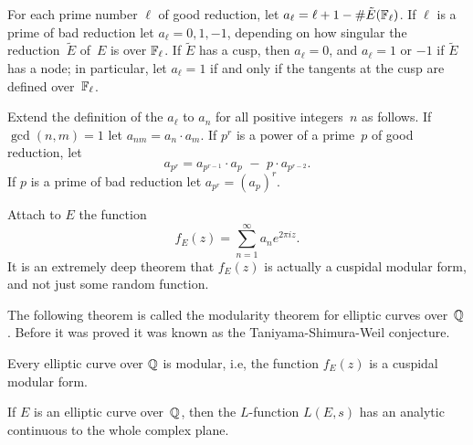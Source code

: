 For each prime number $\ell$ of good reduction, let $a_\ell = \ell+1 -
\#\tilde{E}(\mathbb{F}_{\ell})$.  If $\ell$ is a prime of bad reduction let
$a_\ell = 0,1,-1$, depending on how singular the reduction~$\tilde{E}$
of~$E$ is over $\mathbb{F}_{\ell}$.  If $\tilde{E}$ has a cusp, then $a_\ell=0$,
and $a_\ell=1$ or $-1$ if $\tilde{E}$ has a node; in particular,
let $a_\ell=1$ if
and only if the tangents at the cusp are defined over~$\mathbb{F}_{\ell}$.

Extend the definition of the $a_\ell$ to $a_n$ for all positive
integers~$n$ as follows.  If $\gcd(n,m)=1$ let $a_{nm} = a_n \cdot
a_m$.  If $p^r$ is a power of a prime~$p$ of good reduction, let
$$
 a_{p^r} = a_{p^{r-1}}\cdot a_p \,\,-\,\, p \cdot a_{p^{r-2}}.
$$
If $p$ is a prime of bad reduction let $a_{p^r} = (a_p)^r$.

Attach to $E$ the function
$$
  f_E(z) = \sum_{n=1}^{\infty} a_n e^{2\pi i z}.
$$
It is an extremely deep theorem that $f_E(z)$ is actually
a cuspidal modular form, and not just some random function.


The following theorem is called the modularity theorem for elliptic
curves over~$\mathbb{Q}$.  Before it was proved it was known as the
Taniyama-Shimura-Weil conjecture.
\begin{theorem}
Every elliptic curve over $\mathbb{Q}$ is modular, i.e, the function
$f_E(z)$  is a cuspidal modular form.
\end{theorem}

\begin{corollary}[Hecke]\label{cor:hecke}
  If $E$ is an elliptic curve over~$\mathbb{Q}$, then the $L$-function
  $L(E,s)$ has an analytic continuous to the whole complex plane.
\end{corollary}



